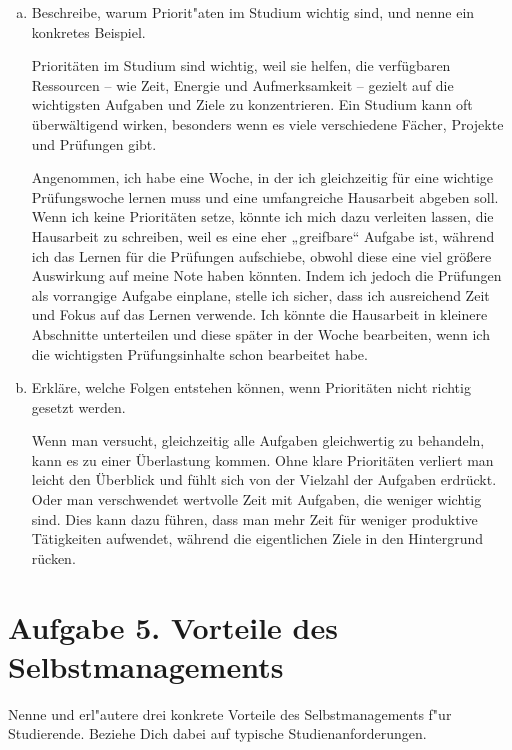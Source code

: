 \documentclass[10pt, oneside]{article}
\begin{document}
\begin{enumerate}[(a)]
    \item Beschreibe, warum Priorit"aten im Studium wichtig sind, und nenne ein
        konkretes Beispiel.

        Prioritäten im Studium sind wichtig, weil sie helfen, die verfügbaren
        Ressourcen – wie Zeit, Energie und Aufmerksamkeit – gezielt auf die
        wichtigsten Aufgaben und Ziele zu konzentrieren. Ein Studium kann oft
        überwältigend wirken, besonders wenn es viele verschiedene Fächer,
        Projekte und Prüfungen gibt.

        Angenommen, ich habe eine Woche, in der ich gleichzeitig für eine wichtige
        Prüfungswoche lernen muss und eine umfangreiche Hausarbeit abgeben soll. Wenn
        ich keine Prioritäten setze, könnte ich mich dazu verleiten lassen, die
        Hausarbeit zu schreiben, weil es eine eher „greifbare“ Aufgabe
        ist, während ich das Lernen für die Prüfungen aufschiebe, obwohl diese eine
        viel größere Auswirkung auf meine Note haben könnten. Indem ich jedoch die
        Prüfungen als vorrangige Aufgabe einplane, stelle ich sicher, dass ich
        ausreichend Zeit und Fokus auf das Lernen verwende. Ich könnte die Hausarbeit
        in kleinere Abschnitte unterteilen und diese später in der Woche bearbeiten,
        wenn ich die wichtigsten Prüfungsinhalte schon bearbeitet habe.

    \item Erkläre, welche Folgen entstehen können, wenn Prioritäten nicht
        richtig gesetzt werden.

        Wenn man versucht, gleichzeitig alle Aufgaben gleichwertig zu
        behandeln, kann es zu einer Überlastung kommen. Ohne klare Prioritäten
        verliert man leicht den Überblick und fühlt sich von der Vielzahl der
        Aufgaben erdrückt. Oder man verschwendet wertvolle Zeit mit Aufgaben,
        die weniger wichtig sind. Dies kann dazu führen, dass man mehr Zeit für
        weniger produktive Tätigkeiten aufwendet, während die eigentlichen
        Ziele in den Hintergrund rücken.

\end{enumerate}

\section{Aufgabe 5. Vorteile des Selbstmanagements}

Nenne und erl"autere drei konkrete Vorteile des Selbstmanagements f"ur
Studierende. Beziehe Dich dabei auf typische Studienanforderungen.
\end{document}
